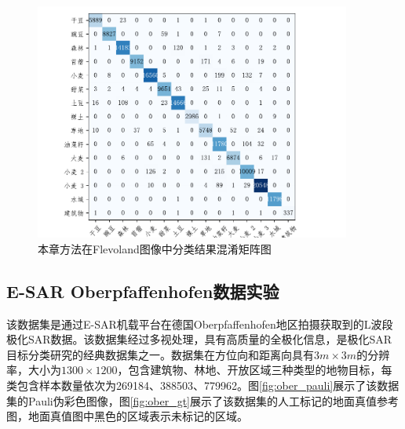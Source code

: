 \begin{figure}[h]
    \centering
    \includegraphics[width=10.4cm]{pic/chapter3/fle/conf-matrix.pdf}
    \caption{本章方法在Flevoland图像中分类结果混淆矩阵图}
    \label{fig:fle_conf_matrix}
\end{figure}



\subsection{E-SAR Oberpfaffenhofen数据实验}
该数据集是通过E-SAR机载平台在德国Oberpfaffenhofen地区拍摄获取到的L波段极化SAR数据。该数据集经过多视处理，具有高质量的全极化信息，是极化SAR目标分类研究的经典数据集之一。数据集在方位向和距离向具有$3m \times 3m$的分辨率，大小为$1300 \times 1200$，包含建筑物、林地、开放区域三种类型的地物目标，每类包含样本数量依次为269184、388503、779962。图\ref{fig:ober_pauli}展示了该数据集的Pauli伪彩色图像，图\ref{fig:ober_gt}展示了该数据集的人工标记的地面真值参考图，地面真值图中黑色的区域表示未标记的区域。

